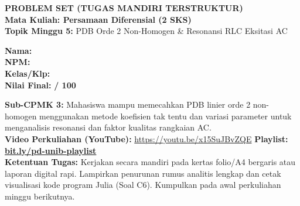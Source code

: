 \documentclass[10pt,a4paper]{article}
\begin{document}
\noindent\begin{minipage}[c]{0.68\textwidth}%
  {\large\textbf{\color{unibblue}PROBLEM SET (TUGAS MANDIRI TERSTRUKTUR)}}\\[1mm]
  {\normalsize\textbf{Mata Kuliah: Persamaan Diferensial (2 SKS)}}\\[0.5mm]
  {\small\textbf{Topik Minggu 5:} PDB Orde 2 Non-Homogen \& Resonansi RLC Eksitasi AC}%
\end{minipage}%
\hfill%
\begin{minipage}[c]{0.30\textwidth}%
  \begin{tcolorbox}[colback=unibblue!5,colframe=unibblue,boxrule=0.6pt,arc=2pt,left=4pt,right=4pt,top=2pt,bottom=2pt]
    \scriptsize
    \textbf{Nama:} \dotfill\\[1.2mm]
    \textbf{NPM:} \dotfill\\[1.2mm]
    \textbf{Kelas/Klp:} \dotfill\\[1.2mm]
    \textbf{Nilai Final:} \hfill \textbf{/ 100}
  \end{tcolorbox}%
\end{minipage}\par

\vspace{1.5mm}

\begin{tcolorbox}[colback=boxbg,colframe=unibgold!90!black,boxrule=0.6pt,arc=2pt,left=5pt,right=5pt,top=3pt,bottom=3pt,title=\textbf{\scriptsize Capaian Pembelajaran (Sub-CPMK 3) \& Pedoman Pengerjaan Tugas}]
  \scriptsize
  \textbf{Sub-CPMK 3:} Mahasiswa mampu memecahkan PDB linier orde 2 non-homogen menggunakan metode koefisien tak tentu dan variasi parameter untuk menganalisis resonansi dan faktor kualitas rangkaian AC.\\
  \textbf{Video Perkuliahan (YouTube):} \url{https://youtu.be/x15SuJBvZQE} \hfill \textbf{Playlist:} \href{https://www.youtube.com/playlist?list=PLS5oOZWXZeTw}{\color{unibblue}\textbf{bit.ly/pd-unib-playlist}}\\\textbf{Ketentuan Tugas:} Kerjakan secara mandiri pada kertas folio/A4 bergaris atau laporan digital rapi. Lampirkan penurunan rumus analitis lengkap dan cetak visualisasi kode program Julia (Soal C6). Kumpulkan pada awal perkuliahan minggu berikutnya.
\end{tcolorbox}

\vspace{1.5mm}
\end{document}
